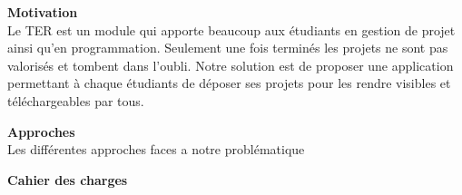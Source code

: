 \documentclass{report}
\begin{document}
\vspace{1cm}
\textbf{\huge{}{Motivation}}\\

Le TER est un module qui apporte beaucoup aux étudiants en gestion de projet ainsi qu'en programmation. Seulement une fois terminés les projets ne sont pas valorisés et tombent dans l'oubli. Notre solution est de proposer une application permettant à chaque étudiants de déposer ses projets pour les rendre visibles et téléchargeables par tous.

\vspace{1cm}
\textbf{\huge{}{Approches}}\\

Les différentes approches faces a notre problématique

\vspace{1cm}
\textbf{\huge{}{Cahier des charges}}\\
\end{document}
